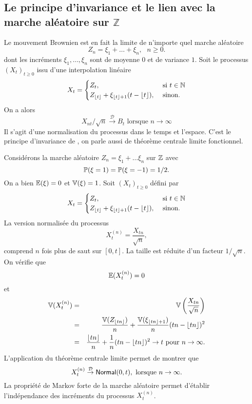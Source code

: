 \subsection{Le principe d'invariance et le lien avec la marche aléatoire sur $\mathbb{Z}$}
Le mouvement Brownien est en fait la limite de n'importe quel marche aléatoire 
$$
Z_n = \xi_1+\ldots+ \xi_n,\text{ }n\geq 0.
$$
dont les incréments $\xi_1,\ldots, \xi_n$ sont \iid de moyenne $0$ et de variance $1$. Soit le processus $(X_t)_{t\geq 0}$ issu d'une interpolation linéaire
$$
X_t = \begin{cases}
Z_t,&\text{ si }t\in \mathbb{N}\\
Z_{\lfloor t\rfloor} + \xi_{\lfloor t\rfloor +1}(t-\lfloor t\rfloor),&\text{ sinon.}
\end{cases}  
$$ 
On a alors 
$$
X_{nt}/\sqrt{n}\overset{\mathcal{D}}{\rightarrow}B_t\text{ lorsque }n\rightarrow \infty
$$
Il s'agit d'une normalisation du processus dans le temps et l'espace. C'est le principe d'invariance de \citet{Donsker1951}, on parle aussi de théorème centrale limite fonctionnel.
\begin{ex}
Considérons la marche aléatoire $Z_n = \xi_1+\ldots \xi_n$ sur $\mathbb{Z}$ avec 
$$
\mathbb{P}(\xi = 1)=\mathbb{P}(\xi = -1) = 1/2.
$$
On a bien $\mathbb{E}(\xi)=0$ et $\mathbb{V}(\xi) = 1$. Soit $(X_t)_{t\geq 0}$ défini par 
$$
X_t = \begin{cases}
Z_t,&\text{ si }t\in \mathbb{N}\\
Z_{\lfloor t\rfloor} + \xi_{\lfloor t\rfloor +1 }(t-\lfloor t\rfloor),&\text{ sinon.}
\end{cases}  
$$ 
La version normalisée du processus 
$$
X_t^{(n)} = \frac{X_{tn}}{\sqrt{n}},
$$
comprend $n$ fois plus de saut sur $[0,t]$. La taille est réduite d'un facteur $1/\sqrt{n}$. On vérifie que 
$$
\mathbb{E}(X_t^{(n)}) = 0
$$
et 
\begin{eqnarray*}
\mathbb{V}(X_t^{(n)}) &=& \mathbb{V}\left(\frac{X_{tn}}{\sqrt{n}}\right)\\
&=& \frac{\mathbb{V}(Z_{\lfloor tn\rfloor})}{n}+\frac{\mathbb{V}(\xi_{\lfloor tn\rfloor +1})}{n}(tn-\lfloor tn\rfloor)^2\\
&=&\frac{\lfloor tn\rfloor}{n}+\frac{1}{n}(tn-\lfloor tn\rfloor)^2\rightarrow  t\text{ pour }n\rightarrow \infty.
\end{eqnarray*}
L'application du théorème centrale limite permet de montrer que 
$$
X_t^{(n)}\overset{\mathcal{D}}{\rightarrow}\mathsf{Normal}(0,t),\text{ lorsque }n\rightarrow \infty.
$$
La propriété de Markov forte de la marche aléatoire permet d'établir l'indépendance des incréments du processus $X_t^{(n)}$. 
\end{ex}
